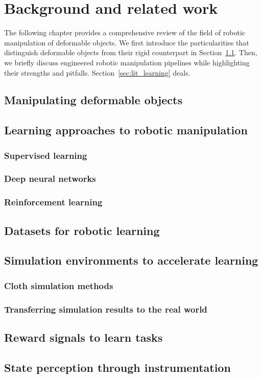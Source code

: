 \documentclass[\home/main.tex]{subfiles}
\begin{document}
\chapter{Background and related work}\label{ch:sota} 

The following chapter provides a comprehensive review of the field of robotic manipulation of deformable objects. We first introduce the particularities that distinguish deformable objects from their rigid counterpart in Section~\ref{sec:test}. Then, we briefly discuss engineered robotic manipulation pipelines while highlighting their strengths and pitfalls. Section~\ref{sec:lit_learning} deals.

\section{Manipulating deformable objects} \label{sec:test}

\section{Learning approaches to robotic manipulation} %
\subsection{Supervised learning}
\subsection{Deep neural networks}
\subsection{Reinforcement learning}

\section{Datasets for robotic learning}
\section{Simulation environments to accelerate learning}
\subsection{Cloth simulation methods}
\subsection{Transferring simulation results to the real world}
\section{Reward signals to learn tasks}
\section{State perception through instrumentation}
\end{document}
